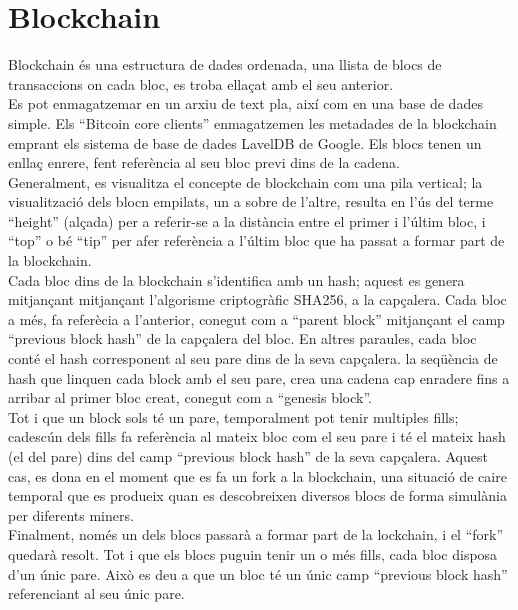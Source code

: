 \section{Blockchain}
\label{blockchain}
Blockchain és una estructura de dades ordenada, una llista de blocs de transaccions on cada bloc, es troba ellaçat amb el seu anterior.\\
\newline Es pot enmagatzemar en un arxiu de text pla, així com en una base de dades simple. Els “Bitcoin core clients” enmagatzemen les metadades de la blockchain emprant els sistema de base de dades LavelDB de Google. Els blocs tenen un enllaç enrere, fent referència al seu bloc previ dins de la cadena.\\
\newline Generalment, es visualitza el concepte de blockchain com una pila vertical; la visualització dels blocn empilats, un a sobre de l’altre, resulta en l’ús del terme “height” (alçada) per a referir-se a la distància entre el primer i l’últim bloc, i “top” o bé “tip” per afer referència a l’últim bloc que ha passat a formar part de la blockchain.\\
\newline Cada bloc dins de la blockchain s’identifica amb un hash; aquest es genera mitjançant mitjançant l’algorisme criptogràfic SHA256, a la capçalera. Cada bloc a més, fa referècia a l’anterior, conegut com a “parent block” mitjançant el camp “previous block hash” de la capçalera del bloc. En altres paraules, cada bloc conté el hash corresponent al seu pare dins de la seva capçalera. la seqüència de hash que linquen cada block amb el seu pare, crea una cadena cap enradere fins a arribar al primer bloc creat, conegut com a “genesis block”.\\
\newline Tot i que un block sols té un pare, temporalment pot tenir multiples fills; cadescún dels fills fa referència al mateix bloc com el seu pare i té el mateix hash (el del pare) dins del camp “previous block hash” de la seva capçalera. Aquest cas, es dona en el moment que es fa un fork a la blockchain, una situació de caire temporal que es produeix quan es descobreixen diversos blocs de forma simulània per diferents miners.\\
Finalment, només un dels blocs passarà a formar part de la lockchain, i el “fork” quedarà resolt. Tot i que els blocs puguin tenir un o més fills, cada bloc disposa d’un únic pare. Això es deu a que un bloc té un únic camp “previous block hash” referenciant al seu únic pare.\\
